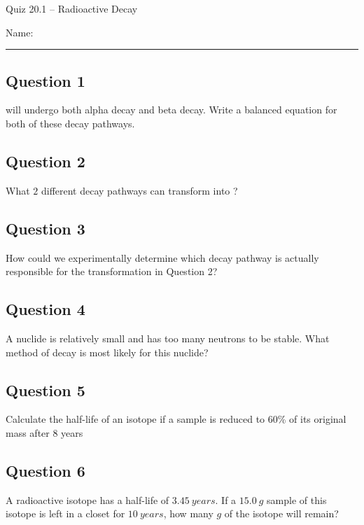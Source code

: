 \documentclass[11pt, letterpaper]{memoir}
\begin{document}
	\begin{center}
		{\large	Quiz 20.1 -- Radioactive Decay}
	\end{center}
	{\large Name: \rule[-1mm]{4in}{.1pt} 

\subsection*{Question 1}
 will undergo both alpha decay and beta decay. Write a balanced equation for both of these decay pathways.

\vspace{4em}
\subsection*{Question 2}
What $2$ different decay pathways can transform  into ?

\vspace{3em}
\subsection*{Question 3} 
How could we experimentally determine which decay pathway is actually responsible for the transformation in Question 2?

\vspace{3em}
\subsection*{Question 4}
A nuclide is relatively small and has too many neutrons to be stable. What method of decay is most likely for this nuclide?

\vspace{3em}
\subsection*{Question 5}
Calculate the half-life of an isotope if a sample is reduced to 60\% of its original mass after 8 years

\vspace{5em}
\subsection*{Question 6}
A radioactive isotope has a half-life of $3.45~years$. If a $15.0~g$ sample of this isotope is left in a closet for $10~years$, how many $g$ of the isotope will remain?
	\newpage
	\pagestyle{empty}
	\addtocounter{page}{-1}
\newpage
}
\end{document}
